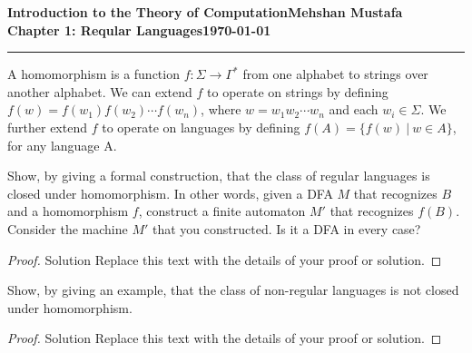 \documentclass[11pt]{article}
\newcommand{\myname}{Mehshan Mustafa}
\newcommand{\dated}{\today}
\newenvironment{problem}[2][Problem]{\begin{trivlist}
\item[\hskip \labelsep {\bfseries #1}\hskip \labelsep {\bfseries #2.}]}{\end{trivlist}}
\begin{document}
\textbf{Introduction to the Theory of
Computation}\hfill\textbf{\myname}\\[0.01in]
\textbf{Chapter 1: Reqular Languages}\hfill\textbf{\dated}\\
\smallskip\hrule\bigskip

\begin{problem}{1.66}
A homomorphism is a function $f : \Sigma \longrightarrow \Gamma^{*}$ from one alphabet to strings over another alphabet. We can extend $f$ to operate on strings by defining $f(w) = f(w_{1})f(w_{2}) \cdots f(w_{n})$, where $w = w_{1}w_{2} \cdots w_{n}$ and  each $w_{i} \in \Sigma$. We further
extend $f$ to operate on languages by defining $f(A) = \{f(w) \ | \ w \in A\}$, for any language A.
\end{problem}

\begin{problem}[Part]{a}
Show, by giving a formal construction, that the class of regular languages
is closed under homomorphism. In other words, given a DFA $M$ that recognizes $B$ and a homomorphism $f$, construct a finite automaton $M'$ that recognizes $f(B)$. Consider the machine $M'$ that you constructed. Is it a DFA in every case?
\end{problem}

\begin{proof}
Solution Replace this text with the details of your proof or solution.
\end{proof}

\begin{problem}[Part]{b}
Show, by giving an example, that the class of non-regular languages is not
closed under homomorphism.
\end{problem}

\begin{proof}
Solution Replace this text with the details of your proof or solution.
\end{proof}
\end{document}
